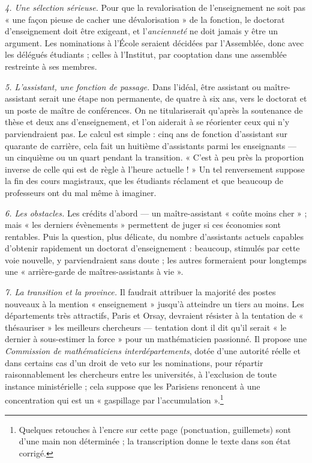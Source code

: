 \documentclass[11pt,a4paper]{article}
\begin{document}
\emph{4. Une sélection sérieuse.} Pour que la revalorisation de
l'enseignement ne soit pas « une façon pieuse de cacher une dévalorisation »
de la fonction, le doctorat d'enseignement doit être exigeant, et
l'\emph{ancienneté} ne doit jamais y être un argument. Les nominations à
l'École seraient décidées par l'Assemblée, donc avec les délégués étudiants ;
celles à l'Institut, par cooptation dans une assemblée restreinte à ses
membres.

\emph{5. L'assistant, une fonction de passage.} Dans l'idéal, être assistant
ou maître-assistant serait une étape non permanente, de quatre à six ans,
vers le doctorat et un poste de maître de conférences. On ne titulariserait
qu'après la soutenance de thèse et deux ans d'enseignement, et l'on aiderait
à se réorienter ceux qui n'y parviendraient pas. Le calcul est simple : cinq
ans de fonction d'assistant sur quarante de carrière, cela fait un huitième
d'assistants parmi les enseignants — un cinquième ou un quart pendant la
transition. « C'est à peu près la proportion inverse de celle qui est de
règle à l'heure actuelle ! » Un tel renversement suppose la fin des cours
magistraux, que les étudiants réclament et que beaucoup de professeurs ont du
mal même à imaginer.

\emph{6. Les obstacles.} Les crédits d'abord — un maître-assistant « coûte
moins cher » ; mais « les derniers évènements » permettent de juger si ces
économies sont rentables. Puis la question, plus délicate, du nombre
d'assistants actuels capables d'obtenir rapidement un doctorat
d'enseignement : beaucoup, stimulés par cette voie nouvelle, y parviendraient
sans doute ; les autres formeraient pour longtemps une « arrière-garde de
maîtres-assistants à vie ».

\emph{7. La transition et la province.} Il faudrait attribuer la majorité des
postes nouveaux à la mention « enseignement » jusqu'à atteindre un tiers au
moins. Les départements très attractifs, Paris et Orsay, devraient résister à
la tentation de « thésauriser » les meilleurs chercheurs — tentation dont il
dit qu'il serait « le dernier à sous-estimer la force » pour un mathématicien
passionné. Il propose une \emph{Commission de mathématiciens
interdépartements}, dotée d'une autorité réelle et dans certains cas d'un droit
de veto sur les nominations, pour répartir raisonnablement les chercheurs
entre les universités, à l'exclusion de toute instance ministérielle ; cela
suppose que les Parisiens renoncent à une concentration qui est un
« gaspillage par l'accumulation ».\footnote{Quelques retouches à l'encre sur
cette page (ponctuation, guillemets) sont d'une main non déterminée ; la
transcription donne le texte dans son état corrigé.}
\end{document}
